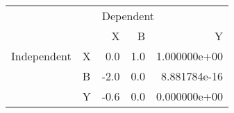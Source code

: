 \begin{tabular}{llrrr}
\toprule
            &   & \multicolumn{3}{l}{Dependent} \\
            &   &         X &    B &             Y \\
\midrule
Independent & X &       0.0 &  1.0 &  1.000000e+00 \\
            & B &      -2.0 &  0.0 &  8.881784e-16 \\
            & Y &      -0.6 &  0.0 &  0.000000e+00 \\
\bottomrule
\end{tabular}
